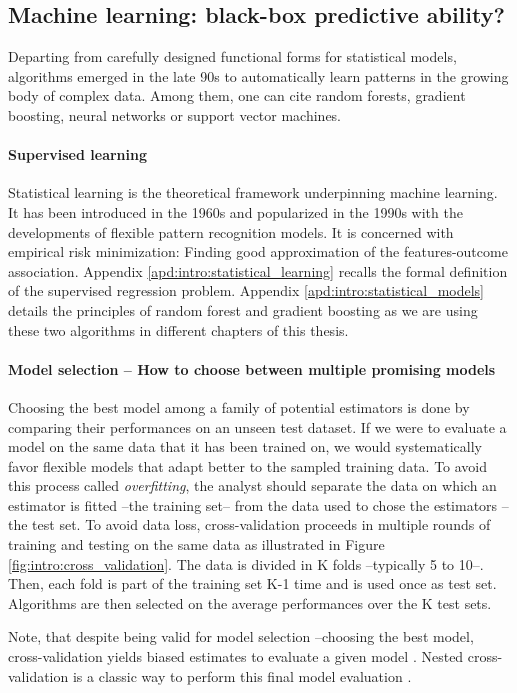 \documentclass[french,12pt,twoside,a4paper]{book}
\begin{document}
\begin{background_box_left}

  \subsection{Machine learning: black-box predictive ability?}\label{subsec:intro:machine_learning}

  Departing from carefully designed functional forms for statistical models,
  algorithms emerged in the late 90s to automatically learn patterns in the
  growing body of complex data. Among them, one can cite random forests,
  gradient boosting, neural networks or support vector machines.

  \paragraph{Supervised learning}

  Statistical learning \citep{vapnik1999nature} is the theoretical framework
  underpinning machine learning. It has been introduced in the 1960s and
  popularized in the 1990s with the developments of flexible pattern recognition
  models. It is concerned with empirical risk minimization: Finding good
  approximation of the features-outcome association. Appendix
  \ref{apd:intro:statistical_learning} recalls the formal definition of the
  supervised regression problem. Appendix \ref{apd:intro:statistical_models}
  details the principles of random forest and gradient boosting as we are
  using these two algorithms in different chapters of this thesis.

  \paragraph{Model selection -- How to choose between multiple promising models}

  Choosing the best model among a family of potential estimators is done by
  comparing their performances on an unseen test dataset. If we were to evaluate
  a model on the same data that it has been trained on, we would systematically
  favor flexible models that adapt better to the sampled training data. To avoid
  this process called \emph{overfitting}, the analyst should separate the data
  on which an estimator is fitted --the training set-- from the data used to
  chose the estimators --the test set. To avoid data loss, cross-validation
  \citep{stone1974cross} proceeds in multiple rounds of training and testing on
  the same data as illustrated in Figure \ref{fig:intro:cross_validation}. The
  data is divided in K folds --typically 5 to 10--. Then, each fold is part of
  the training set K-1 time and is used once as test set. Algorithms are then
  selected on the average performances over the K test sets.

  Note, that despite being valid for model selection --choosing the best model,
  cross-validation yields biased estimates to evaluate a given model
  \citep{wager2020cross}. Nested cross-validation is a classic way to perform
  this final model evaluation \citep{varoquaux2017assessing}.

\end{background_box_left}
\end{document}
